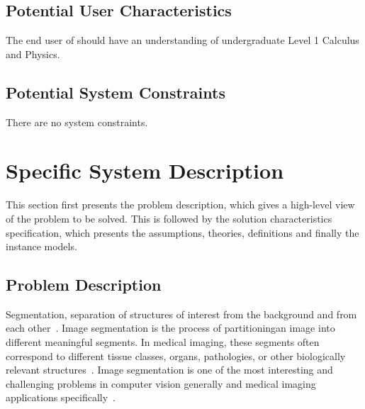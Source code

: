 \documentclass[12pt]{article}
\begin{document}
\begin{center}
\label{fg_syscontext}
\end{center}

\subsection{Potential User Characteristics} \label{sec_UserCharacteristics}

The end user of \progname{} should have an understanding of undergraduate Level
1 Calculus and Physics.

\subsection{Potential System Constraints}

There are no system constraints.

\section{Specific System Description}
This section first presents the problem description, which gives a high-level
view of the
problem to be solved. This is followed by the solution characteristics
specification, which
presents the assumptions, theories, definitions and finally the instance
models.\subsection{Problem Description} \label{sec_ProblemDes}
Segmentation, separation of structures of interest from the background and from
each other~\cite{Bankman2000}. Image segmentation is the process of
partitioningan image into different meaningful segments. In medical imaging,
these segments
often correspond to different tissue classes, organs, pathologies, or other
biologically relevant structures~\cite{Forouzanfar2010}. Image segmentation is
one of the most interesting and challenging problems in computer vision
generally and medical imaging applications specifically~\cite{Elnakib2011}.
\end{document}
